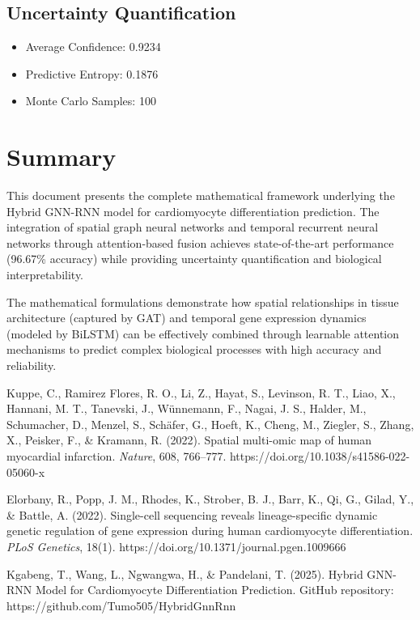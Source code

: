 \documentclass[12pt]{article}
\begin{document}
\subsection{Uncertainty Quantification}
\begin{itemize}
    \item Average Confidence: 0.9234
    \item Predictive Entropy: 0.1876
    \item Monte Carlo Samples: 100
\end{itemize}

\section{Summary}

This document presents the complete mathematical framework underlying the Hybrid GNN-RNN model for cardiomyocyte differentiation prediction. The integration of spatial graph neural networks and temporal recurrent neural networks through attention-based fusion achieves state-of-the-art performance (96.67\% accuracy) while providing uncertainty quantification and biological interpretability.

The mathematical formulations demonstrate how spatial relationships in tissue architecture (captured by GAT) and temporal gene expression dynamics (modeled by BiLSTM) can be effectively combined through learnable attention mechanisms to predict complex biological processes with high accuracy and reliability.

\begin{thebibliography}{99}

Kuppe, C., Ramirez Flores, R. O., Li, Z., Hayat, S., Levinson, R. T., Liao, X., Hannani, M. T., Tanevski, J., Wünnemann, F., Nagai, J. S., Halder, M., Schumacher, D., Menzel, S., Schäfer, G., Hoeft, K., Cheng, M., Ziegler, S., Zhang, X., Peisker, F., \& Kramann, R. (2022). Spatial multi-omic map of human myocardial infarction. \textit{Nature}, 608, 766–777. https://doi.org/10.1038/s41586-022-05060-x

Elorbany, R., Popp, J. M., Rhodes, K., Strober, B. J., Barr, K., Qi, G., Gilad, Y., \& Battle, A. (2022). Single-cell sequencing reveals lineage-specific dynamic genetic regulation of gene expression during human cardiomyocyte differentiation. \textit{PLoS Genetics}, 18(1). https://doi.org/10.1371/journal.pgen.1009666

Kgabeng, T., Wang, L., Ngwangwa, H., \& Pandelani, T. (2025). Hybrid GNN-RNN Model for Cardiomyocyte Differentiation Prediction. GitHub repository: https://github.com/Tumo505/HybridGnnRnn

\end{thebibliography}
\end{document}
